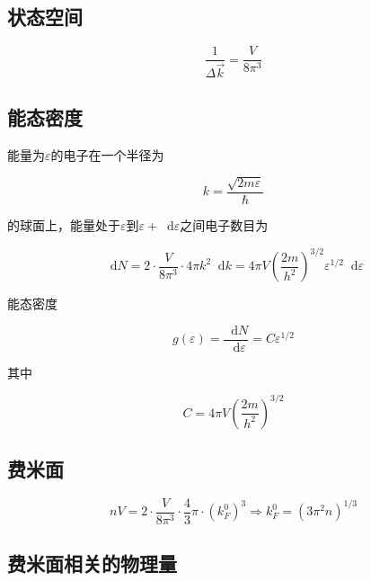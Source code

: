 \documentclass{article}
\newcommand*{\md}{\mathop{}\!\mathrm{d}}
\begin{document}
\begin{multicols}{2}
\subsection{状态空间}

\begin{equation*}
  \frac{1}{\Delta \vec{k}} = \frac{V}{8\pi^3}
\end{equation*}

\subsection{能态密度}

能量为$\varepsilon$的电子在一个半径为

\begin{equation*}
  k = \frac{\sqrt{2m\varepsilon} }{\hbar}
\end{equation*}

的球面上，能量处于$\varepsilon$到$\varepsilon + \md \varepsilon$之间电子数目为

\begin{equation*}
  \md N = 2\cdot \frac{V}{8\pi^3}\cdot 4\pi k^2 \md k = 4\pi V \left( \frac{2m}{h^2} \right)^{3/2} \varepsilon^{1/2} \md \varepsilon
\end{equation*}

能态密度

\begin{equation*}
  g \left( \varepsilon \right) = \frac{\md N}{\md \varepsilon} = C \varepsilon^{1/2}
\end{equation*}

其中

\begin{equation*}
  C = 4\pi V \left( \frac{2m}{h^2} \right)^{3/2}
\end{equation*}

\subsection{费米面}

\begin{equation*}
  nV = 2\cdot \frac{V}{8\pi^3}\cdot \frac{4}{3} \pi \cdot \left( k_F^0 \right)^3 \Rightarrow k_F^0 = \left( 3\pi^2 n \right)^{1/3}
\end{equation*}

\subsection{费米面相关的物理量}


\end{multicols}
\end{document}
